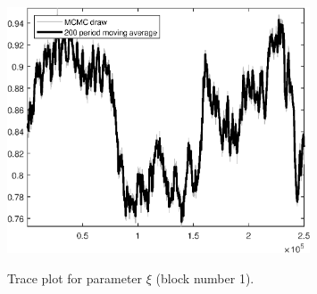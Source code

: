 \begin{figure}[H]
\centering
  \includegraphics[width=0.8\textwidth]{BRS_aggregate/graphs/TracePlot_xi_blck_1}\\
    \caption{Trace plot for parameter $\xi$ (block number 1).}
\end{figure}
